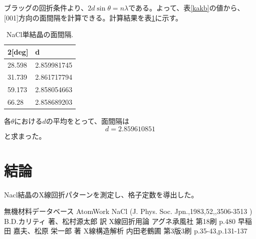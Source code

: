 \documentclass[11pt,a4j,uplatex]{jsarticle}
\begin{document}
\newpage

 ブラッグの回折条件より、$2d\sin\theta=n\lambda$である。よって、表\ref{kakb}の値から、[001]方向の面間隔を計算できる。計算結果を表\ref{d}に示す。%

 \begin{table}[htbp]
  \begin{center}
   \caption{NaCl単結晶の面間隔.}
   \begin{tabular}{|l|l|}  \hline
    2[deg] & d           \\  \hline  \hline
    28.598 & 2.859981745 \\
    31.739 & 2.861717794 \\
    59.173 & 2.858054663 \\
    66.28  & 2.858689203 \\ \hline
   \end{tabular}
   \label{d}
  \end{center}
 \end{table}

 各$\theta$における$d$の平均をとって、面間隔は
 \begin{equation}
  d=2.859610851
  \label{fin}
 \end{equation}
 と求まった。
\fi

\section{結論}
Nacl結晶のX線回折パターンを測定し、格子定数を導出した。

\begin{thebibliography}{9}
 無機材料データベース AtomWork  NaCl (J. Phys. Soc. Jpn.,1983,52,,3506-3513 )
  B.D.カリティ 著、松村源太郎 訳 X線回折用論 アグネ承風社 第18刷 p.480
  早稲田 嘉夫、松原 栄一郎 著 X線構造解析 内田老鶴圃 第3版3刷 p.35-43,p.131-137


\end{thebibliography}
\end{document}
